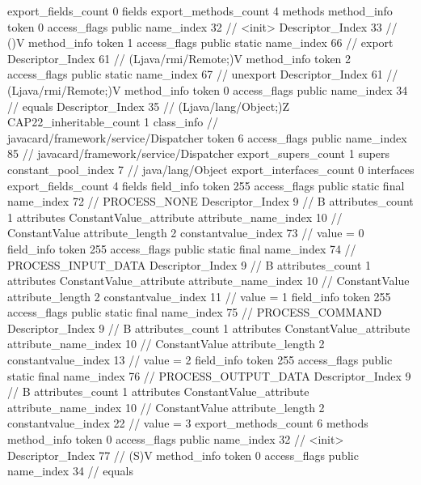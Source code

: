 {{{{			}
			export_fields_count	0
			fields {
			}
			export_methods_count	4
			methods {
				method_info {
					token	0
					access_flags	public
					name_index	32		// <init>
					Descriptor_Index	33		// ()V
				}
				method_info {
					token	1
					access_flags	public static
					name_index	66		// export
					Descriptor_Index	61		// (Ljava/rmi/Remote;)V
				}
				method_info {
					token	2
					access_flags	public static
					name_index	67		// unexport
					Descriptor_Index	61		// (Ljava/rmi/Remote;)V
				}
				method_info {
					token	0
					access_flags	public
					name_index	34		// equals
					Descriptor_Index	35		// (Ljava/lang/Object;)Z
				}
			}
			CAP22_inheritable_count	1
		}
		class_info {		// javacard/framework/service/Dispatcher
			token	6
			access_flags	public
			name_index	85		// javacard/framework/service/Dispatcher
			export_supers_count	1
			supers {
				constant_pool_index	7		// java/lang/Object
			}
			export_interfaces_count	0
			interfaces {
			}
			export_fields_count	4
			fields {
			field_info {
				token	255
				access_flags	public static final
				name_index	72		// PROCESS_NONE
				Descriptor_Index	9		// B
				attributes_count	1
				attributes {
				ConstantValue_attribute {
					attribute_name_index	10		// ConstantValue
					attribute_length	2
					constantvalue_index	73		// value = 0
				}
				}
			}
			field_info {
				token	255
				access_flags	public static final
				name_index	74		// PROCESS_INPUT_DATA
				Descriptor_Index	9		// B
				attributes_count	1
				attributes {
				ConstantValue_attribute {
					attribute_name_index	10		// ConstantValue
					attribute_length	2
					constantvalue_index	11		// value = 1
				}
				}
			}
			field_info {
				token	255
				access_flags	public static final
				name_index	75		// PROCESS_COMMAND
				Descriptor_Index	9		// B
				attributes_count	1
				attributes {
				ConstantValue_attribute {
					attribute_name_index	10		// ConstantValue
					attribute_length	2
					constantvalue_index	13		// value = 2
				}
				}
			}
			field_info {
				token	255
				access_flags	public static final
				name_index	76		// PROCESS_OUTPUT_DATA
				Descriptor_Index	9		// B
				attributes_count	1
				attributes {
				ConstantValue_attribute {
					attribute_name_index	10		// ConstantValue
					attribute_length	2
					constantvalue_index	22		// value = 3
				}
				}
			}
			}
			export_methods_count	6
			methods {
				method_info {
					token	0
					access_flags	public
					name_index	32		// <init>
					Descriptor_Index	77		// (S)V
				}
				method_info {
					token	0
					access_flags	public
					name_index	34		// equals
}}}}}
